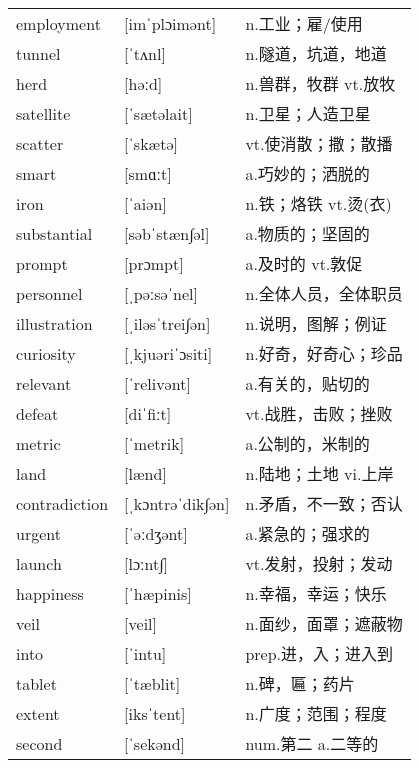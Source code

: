 \documentclass[a4paper]{article}
\begin{document}
\section{}
\begin{tabular}{l l l}

employment & [imˈplɔimənt] & n.工业；雇/使用 \\
tunnel & [ˈtʌnl] & n.隧道，坑道，地道 \\
herd & [həːd] & n.兽群，牧群 vt.放牧 \\
satellite & [ˈsætəlait] & n.卫星；人造卫星 \\
scatter & [ˈskætə] & vt.使消散；撒；散播 \\
smart & [smɑːt] & a.巧妙的；洒脱的 \\
iron & [ˈaiən] & n.铁；烙铁 vt.烫(衣) \\
substantial & [səbˈstæn∫əl] & a.物质的；坚固的 \\
prompt & [prɔmpt] & a.及时的 vt.敦促 \\
personnel & [ˌpəːsəˈnel] & n.全体人员，全体职员 \\
illustration & [ˌiləsˈtrei∫ən] & n.说明，图解；例证 \\
curiosity & [ˌkjuəriˈɔsiti] & n.好奇，好奇心；珍品 \\
relevant & [ˈrelivənt] & a.有关的，贴切的 \\
defeat & [diˈfiːt] & vt.战胜，击败；挫败 \\
metric & [ˈmetrik] & a.公制的，米制的 \\
land & [lænd] & n.陆地；土地 vi.上岸 \\
contradiction & [ˌkɔntrəˈdik∫ən] & n.矛盾，不一致；否认 \\
urgent & [ˈəːdʒənt] & a.紧急的；强求的 \\
launch & [lɔːnt∫] & vt.发射，投射；发动 \\
happiness & [ˈhæpinis] & n.幸福，幸运；快乐 \\
veil & [veil] & n.面纱，面罩；遮蔽物 \\
into & [ˈintu] & prep.进，入；进入到 \\
tablet & [ˈtæblit] & n.碑，匾；药片 \\
extent & [iksˈtent] & n.广度；范围；程度 \\
second & [ˈsekənd] & num.第二 a.二等的 \\

\end{tabular}
\end{document}
